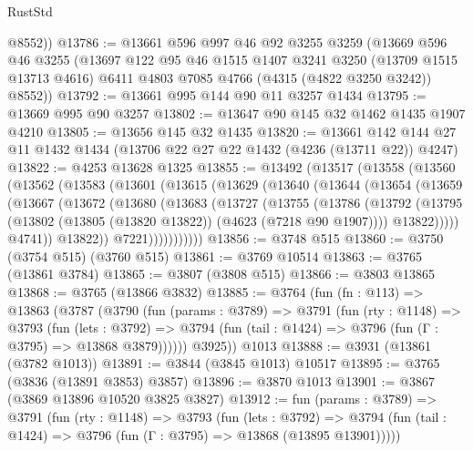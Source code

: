 \begin{lexlean}{RustStd}
\begin{coremodule}
        @8552))
@13786 := @13661
    @596
    @997
    @46
    @92
    @3255
    @3259
    (@13669
      @596
      @46
      @3255
      (@13697
        @122
        @95
        @46
        @1515
        @1407
        @3241
        @3250
        (@13709 @1515 @13713 @4616)
        @6411
        @4803
        @7085
        @4766
        (@4315 (@4822 @3250 @3242))
        @8552))
@13792 := @13661 @995 @144 @90 @11 @3257 @1434
@13795 := @13669 @995 @90 @3257
@13802 := @13647 @90 @145 @32 @1462 @1435 @1907 @4210
@13805 := @13656 @145 @32 @1435
@13820 := @13661 @142 @144 @27 @11 @1432 @1434 (@13706 @22 @27 @22 @1432 (@4236 (@13711 @22)) @4247)
@13822 := @4253 @13628 @1325
@13855 := @13492
    (@13517
      (@13558
        (@13560
          (@13562
            (@13583
              (@13601
                (@13615
                  (@13629
                    (@13640
                      (@13644
                        (@13654
                          (@13659
                            (@13667
                              (@13672
                                (@13680
                                  (@13683
                                    (@13727
                                      (@13755
                                        (@13786
                                          (@13792
                                            (@13795
                                              (@13802
                                                (@13805 (@13820 @13822))
                                                (@4623 (@7218 @90 @1907))))
                                            @13822)))))
                                  @4741))
                              @13822))
                          @7221)))))))))))
@13856 := @3748 @515
@13860 := @3750 (@3754 @515) (@3760 @515)
@13861 := @3769 @10514
@13863 := @3765 (@13861 @3784)
@13865 := @3807 (@3808 @515)
@13866 := @3803 @13865
@13868 := @3765 (@13866 @3832)
@13885 := @3764
    (fun (fn : @113) =>
    @13863
      (@3787
        (@3790
          (fun (params : @3789) =>
          @3791
            (fun (rty : @1148) =>
            @3793
              (fun (lets : @3792) =>
              @3794 (fun (tail : @1424) => @3796 (fun (Γ : @3795) => @13868 @3879))))))
        @3925))
    @1013
@13888 := @3931 (@13861 (@3782 @1013))
@13891 := @3844 (@3845 @1013) @10517
@13895 := @3765 (@3836 (@13891 @3853) @3857)
@13896 := @3870 @1013
@13901 := @3867 (@3869 @13896 @10520 @3825 @3827)
@13912 := fun (params : @3789) =>
  @3791
    (fun (rty : @1148) =>
    @3793
      (fun (lets : @3792) =>
      @3794 (fun (tail : @1424) => @3796 (fun (Γ : @3795) => @13868 (@13895 @13901)))))

\end{coremodule}
\end{lexlean}
